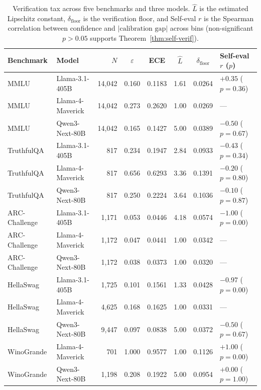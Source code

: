 \begin{table}[t]
\centering
\caption{Verification tax across five benchmarks and three models. $\hat{L}$ is the estimated Lipschitz constant, $\delta_{\mathrm{floor}}$ is the verification floor, and Self-eval $r$ is the Spearman correlation between confidence and $|\text{calibration gap}|$ across bins (non-significant $p > 0.05$ supports Theorem~\ref{thm:self-verif}).}
\label{tab:all-benchmarks}
\small
\begin{tabular}{llrccccl}
\toprule
Benchmark & Model & $N$ & $\varepsilon$ & ECE & $\hat{L}$ & $\delta_{\mathrm{floor}}$ & Self-eval $r$ ($p$) \\
\midrule
MMLU & Llama-3.1-405B & 14,042 & 0.160 & 0.1183 & 1.61 & 0.0264 & $+0.35$ ($p=0.36$) \\
MMLU & Llama-4-Maverick & 14,042 & 0.273 & 0.2620 & 1.00 & 0.0269 & --- \\
MMLU & Qwen3-Next-80B & 14,042 & 0.165 & 0.1427 & 5.00 & 0.0389 & $-0.50$ ($p=0.67$) \\
\midrule
TruthfulQA & Llama-3.1-405B & 817 & 0.234 & 0.1947 & 2.84 & 0.0933 & $-0.43$ ($p=0.34$) \\
TruthfulQA & Llama-4-Maverick & 817 & 0.656 & 0.6293 & 3.36 & 0.1391 & $-0.20$ ($p=0.80$) \\
TruthfulQA & Qwen3-Next-80B & 817 & 0.250 & 0.2224 & 3.64 & 0.1036 & $-0.10$ ($p=0.87$) \\
\midrule
ARC-Challenge & Llama-3.1-405B & 1,171 & 0.053 & 0.0446 & 4.18 & 0.0574 & $-1.00$ ($p=0.00$) \\
ARC-Challenge & Llama-4-Maverick & 1,172 & 0.047 & 0.0441 & 1.00 & 0.0342 & --- \\
ARC-Challenge & Qwen3-Next-80B & 1,172 & 0.038 & 0.0373 & 1.00 & 0.0320 & --- \\
\midrule
HellaSwag & Llama-3.1-405B & 1,725 & 0.101 & 0.1561 & 1.33 & 0.0428 & $-0.97$ ($p=0.00$) \\
HellaSwag & Llama-4-Maverick & 4,625 & 0.168 & 0.1625 & 1.00 & 0.0331 & --- \\
HellaSwag & Qwen3-Next-80B & 9,447 & 0.097 & 0.0838 & 5.00 & 0.0372 & $-0.50$ ($p=0.67$) \\
\midrule
WinoGrande & Llama-4-Maverick & 701 & 1.000 & 0.9577 & 1.00 & 0.1126 & $+1.00$ ($p=0.00$) \\
WinoGrande & Qwen3-Next-80B & 1,198 & 0.208 & 0.1922 & 5.00 & 0.0954 & $+0.00$ ($p=1.00$) \\
\bottomrule
\end{tabular}
\end{table}
